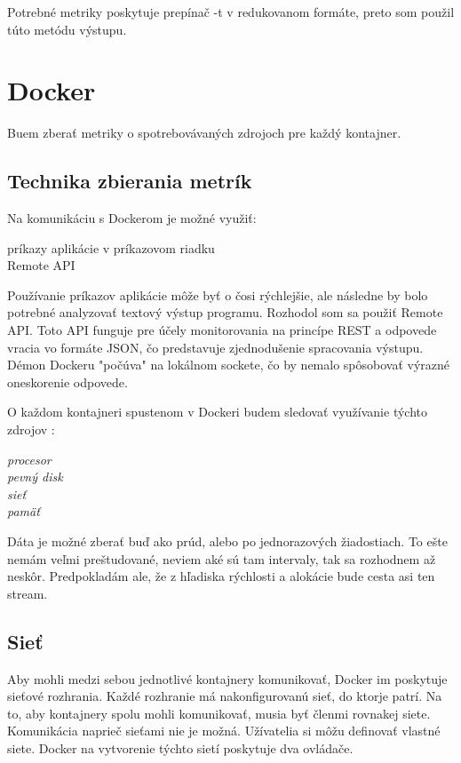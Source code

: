 \documentclass[11pt,final,oneside]{fithesis}
\begin{document}
Potrebné metriky poskytuje prepínač -t v redukovanom formáte, preto som použil túto metódu výstupu.

\section{Docker}
Buem zberať metriky o spotrebovávaných zdrojoch pre každý kontajner.

\subsection{Technika zbierania metrík}
Na komunikáciu s Dockerom je možné využiť:
\begin{description}
\item[príkazy aplikácie v príkazovom riadku]
\item[Remote API]
\end{description}

Používanie príkazov aplikácie môže byť o čosi rýchlejšie, ale následne by bolo potrebné analyzovať textový výstup programu.
Rozhodol som sa použiť Remote API. Toto API funguje pre účely monitorovania na princípe REST a odpovede vracia vo formáte JSON, čo predstavuje zjednodušenie spracovania výstupu. Démon Dockeru "počúva" na 
lokálnom sockete, čo by nemalo spôsobovať výrazné oneskorenie odpovede.

O každom kontajneri spustenom v Dockeri budem sledovať využívanie týchto zdrojov :
\begin{description}
\item[\emph{procesor}]
\item[\emph{pevný disk}]
\item[\emph{sieť}]
\item[\emph{pamäť}]
\end{description}

  
Dáta je možné zberať buď ako prúd, alebo po jednorazových žiadostiach. To ešte nemám veľmi preštudované, neviem aké sú tam intervaly, tak sa rozhodnem až neskôr.
Predpokladám ale, že z hľadiska rýchlosti a alokácie bude cesta asi ten stream.

\subsection{Sieť}
Aby mohli medzi sebou jednotlivé kontajnery komunikovať, Docker im poskytuje sieťové rozhrania. Každé rozhranie má nakonfigurovanú sieť,
do ktorje patrí. Na to, aby kontajnery spolu mohli komunikovať, musia byť členmi rovnakej siete. Komunikácia naprieč sieťami nie je možná.
Užívatelia si môžu definovať vlastné siete. Docker na vytvorenie týchto sietí poskytuje dva ovládače.
\end{document}
